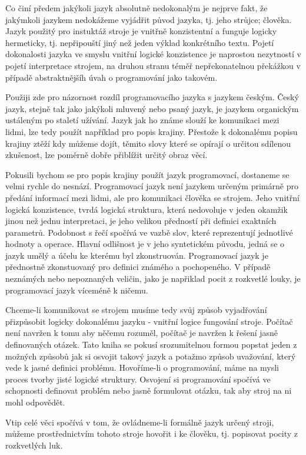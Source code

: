 \documentclass[11pt]{article}
\begin{document}
Co činí předem jakýkoli jazyk absolutně nedokonalým je nejprve fakt, že jakýmkoli jazykem nedokážeme vyjádřit původ jazyka, tj. jeho strůjce; člověka. Jazyk použitý pro instuktáž stroje je vnitřně konzistentní a funguje logicky hermeticky, tj. nepřipouští jiný než jeden výklad konkrétního textu. Pojetí dokonalosti jazyka ve smyslu vnitřní logické konzistence je naprostou nezytností v pojetí interpretace strojem, na druhou stranu téměř nepřekonatelnou překážkou v případě abstraktnějšíh úvah o programování jako takovém.

Použiji zde pro názornost rozdíl programovacího jazyka s jazykem českým. Český jazyk, stejně tak jako jakýkoli mluvený nebo psaný jazyk, je jazykem organickým ustáleným po staletí užívání. Jazyk jak ho známe slouží ke komunikaci mezi lidmi, lze tedy použít například pro popis krajiny. Přestože k dokonalému popisu krajiny ztěží kdy můžeme dojít, těmito slovy které se opírají o určitou sdílenou zkušenost, lze poměrně dobře přiblížit určitý obraz věcí.

Pokusili bychom se pro popis krajiny použít jazyk programovací, dostaneme se velmi rychle do nesnází. Programovací jazyk není jazykem určeným primárně pro předání informací mezi lidmi, ale pro komunikaci člověka se strojem. Jeho vnitřní logická konzistence, tvrdá logická struktura, která nedovoluje v jeden okamžik jinou než jednu interpretaci, je jeho velikou předností při definici exaktních parametrů. Podobnost s řečí spočívá ve vazbě slov, které reprezentují jednotlivé hodnoty a operace. Hlavní odlišnost je v jeho syntetickém původu, jedná se o jazyk umělý a účelu ke kterému byl zkonstruován. Programovací jazyk je přednostně zkonstuovaný pro definici známého a pochopeného. V případě neznámých nebo nepoznaných veličin, jako je napřiklad pocit z rozkvetlé louky, je programovací jazyk víceméně k ničemu. 

Chceme-li komunikovat se strojem musíme tedy svůj způsob vyjadřování přizpůsobit logicky dokonalému jazyku - vnitřní logice fungování stroje. Počítač není navržen k tomu aby něčemu rozuměl, počítač je navržen k řešení jasně definovaných otázek. Tato kniha se pokusí srozumitelnou formou popstat jeden z možných způsobů jak si osvojit takový jazyk a potažmo způsob uvažování, který vede k jasné definici problému. Hovoříme-li o programování, máme na mysli proces tvorby jisté logické struktury. Osvojení si programování spočívá ve schopnosti definovat problém nebo jasně formulovat otázku, tak aby stroj na ni mohl odpovědět.

Vtip celé věci spočívá v tom, že ovládneme-li formálně jazyk určený stroji, můžeme prostřednictvím tohoto stroje hovořit i ke člověku, tj. popisovat pocity z rozkvetlých luk.
\end{document}
